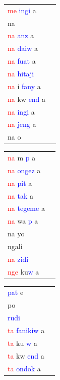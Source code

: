 \documentclass[output=paper,colorlinks,citecolor=brown]{langscibook}
\begin{document}
\begin{table}
\begin{minipage}{.24\textwidth}
\begin{tabular}{ll}
\end{tabular}
\end{minipage}
\begin{minipage}{.24\textwidth}
\begin{tabular}{ll} 
\textcolor{red}{me} \textcolor{blue}{ingi} a     \\ 
na   \\
\textcolor{red}{na} \textcolor{blue}{anz} a   \\ 
\textcolor{red}{na} \textcolor{blue}{daiw} a   \\
\textcolor{red}{na} \textcolor{blue}{fuat} a    \\ 
\textcolor{red}{na} \textcolor{blue}{hitaji}  \\
\textcolor{red}{na} i \textcolor{blue}{fany} a   \\ 
\textcolor{red}{na} kw \textcolor{blue}{end} a   \\ 
\textcolor{red}{na} \textcolor{blue}{ingi} a     \\ 
\textcolor{red}{na} \textcolor{blue}{jeng} a      \\
na o  \\
\end{tabular}
\end{minipage}
\begin{minipage}{.24\textwidth}
\begin{tabular}{ll} 
\textcolor{red}{na} m \textcolor{blue}{p} a     \\ 
\textcolor{red}{na} \textcolor{blue}{ongez} a     \\ 
\textcolor{red}{na} \textcolor{blue}{pit} a     \\
\textcolor{red}{na} \textcolor{blue}{tak} a   \\
\textcolor{red}{na} \textcolor{blue}{tegeme} a     \\ 
\textcolor{red}{na} wa \textcolor{blue}{p} a     \\ 
na yo  \\
ngali   \\   
\textcolor{red}{na} \textcolor{blue}{zidi}   \\ 
\textcolor{red}{nge} ku\textcolor{blue}{w} a   \\
\end{tabular}
\end{minipage}
\begin{minipage}{.24\textwidth}
\begin{tabular}{ll} 
\textcolor{blue}{pat} e   \\ 
po   \\
\textcolor{blue}{rudi}   \\
\textcolor{red}{ta} \textcolor{blue}{fanikiw} a    \\ 
\textcolor{red}{ta} ku \textcolor{blue}{w} a   \\
\textcolor{red}{ta} kw \textcolor{blue}{end} a     \\   
\textcolor{red}{ta} \textcolor{blue}{ondok} a   \\   


\end{tabular}
\end{minipage}
\end{table}
\end{document}
